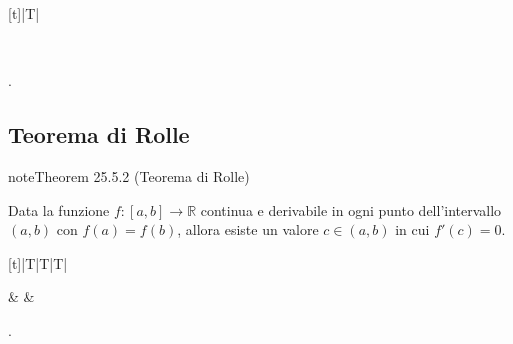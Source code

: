 \documentclass[letterpaper,10pt,italian]{jupyterBook}
\begin{document}
\begin{savenotes}\sphinxattablestart
\centering
\begin{tabulary}{\linewidth}[t]{|T|}
\hline

\sphinxAtStartPar
{}
\\
\hline
\end{tabulary}
\par
\sphinxattableend\end{savenotes}

\sphinxAtStartPar
{\hyperref[\detokenize{ch/infinitesimal_calculus/derivatives-notes:infinitesimal-calculus-derivatives-thm-fermat-notes}]{}}.




\subsection{Teorema di Rolle}
\label{\detokenize{ch/infinitesimal_calculus/derivatives:teorema-di-rolle}}\label{\detokenize{ch/infinitesimal_calculus/derivatives:infinitesimal-calculus-derivatives-thm-rolle}}\label{ch/infinitesimal_calculus/derivatives:thm:infinitesimal-calculus:derivatives:thm:rolle}
\begin{sphinxadmonition}{note}{Theorem 25.5.2 (Teorema di Rolle)}



\sphinxAtStartPar
Data la funzione \(f: [a,b] \rightarrow \mathbb{R}\) continua e derivabile in ogni punto dell’intervallo \((a,b)\) con \(f(a) = f(b)\), allora esiste un valore \(c \in (a,b)\) in cui \(f'(c) = 0\).
\end{sphinxadmonition}


\begin{savenotes}\sphinxattablestart
\centering
\begin{tabulary}{\linewidth}[t]{|T|T|T|}
\hline

\sphinxAtStartPar
{}
&
\sphinxAtStartPar
{}
&
\sphinxAtStartPar
{}
\\
\hline
\end{tabulary}
\par
\sphinxattableend\end{savenotes}

\sphinxAtStartPar
{\hyperref[\detokenize{ch/infinitesimal_calculus/derivatives-notes:infinitesimal-calculus-derivatives-thm-rolle-notes}]{}}.
\end{document}

